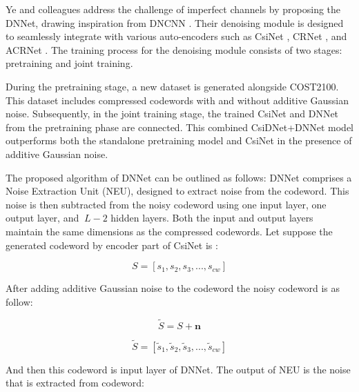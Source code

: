 \documentclass[lettersize,journal]{IEEEtran}
\begin{document}
Ye and colleagues \cite{abw} address the challenge of imperfect channels by proposing the DNNet, drawing inspiration from DNCNN \cite{ccc1}. Their denoising module is designed to seamlessly integrate with various auto-encoders such as CsiNet \cite{abe}, CRNet \cite{abn}, and ACRNet \cite{aby}. The training process for the denoising module consists of two stages: pretraining and joint training.

During the pretraining stage, a new dataset is generated alongside COST2100. This dataset includes compressed codewords with and without additive Gaussian noise. Subsequently, in the joint training stage, the trained CsiNet and DNNet from the pretraining phase are connected. This combined CsiDNet+DNNet model outperforms both the standalone pretraining model and CsiNet in the presence of additive Gaussian noise. 

The proposed algorithm of DNNet can be outlined as follows:
DNNet comprises a Noise Extraction Unit (NEU), designed to extract noise from the codeword. This noise is then subtracted from the noisy codeword using one input layer, one output layer, and 
\begin{math} \ L-2 \end{math} hidden layers. Both the input and output layers maintain the same dimensions as the compressed codewords. Let suppose the generated codeword by encoder part of CsiNet is :

\begin{equation}
		S=[s_{1},s_{2},s_{3},...,s_{cw}]
\end{equation}

After adding additive Gaussian noise to the codeword the noisy codeword is as follow:

\begin{equation}
		\tilde{S}=S+\textbf{n}
\end{equation}



\begin{equation}
		\tilde{S}=[\tilde{s}_{1},\tilde{s}_{2},\tilde{s}_{3},...,\tilde{s}_{cw}]
\end{equation}

And then this codeword is input layer of DNNet. The output of NEU is the noise that is extracted from codeword:
\end{document}
